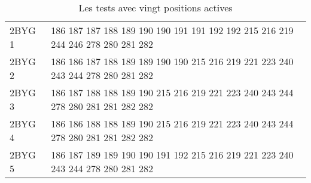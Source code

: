 \begin{table}[!htbp]
\begin{tabular}{ll}
        2BYG 1 & 186 187 187 188 189 190 190 191 191 192 192 215 216 219 244 246 278 280 281 282 \\
        2BYG 2 & 186 186 187 188 189 189 190 190 215 216 219 221 223 240 243 244 278 280 281 282 \\
        2BYG 3 & 186 187 188 188 189 190 215 216 219 221 223 240 243 244 278 280 281 281 282 282 \\
        2BYG 4 & 186 186 188 188 189 190 215 216 219 221 223 240 243 244 278 280 281 281 282 282 \\
        2BYG 5 & 186 187 189 189 190 190 191 192 215 216 219 221 223 240 243 244 278 280 281 282 \\

        \bottomrule

      \end{tabular}      
      \caption{Les tests avec vingt positions actives}
\label{tab:test20}      
    \end{table}


